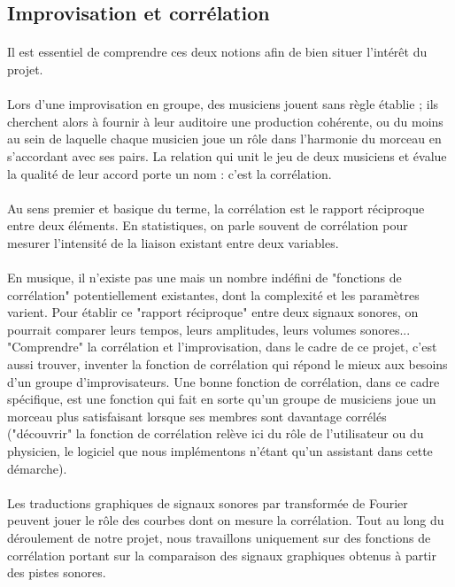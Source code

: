 \subsection{Improvisation et corrélation}
\paragraph{}

Il est essentiel de comprendre ces deux notions afin de bien situer
l'intérêt du projet.

\paragraph{}
Lors d'une improvisation en groupe, des musiciens jouent sans règle
établie ; ils cherchent alors à fournir à leur auditoire une
production cohérente, ou du moins au sein de laquelle chaque musicien
joue un rôle dans l'harmonie du morceau en s'accordant avec ses
pairs. La relation qui unit le jeu de deux musiciens et évalue la
qualité de leur accord porte un nom : c'est la corrélation.
\paragraph{}
Au sens premier et basique du terme, la corrélation est le rapport
réciproque entre deux éléments. En statistiques, on parle souvent de
corrélation pour mesurer l'intensité de la liaison existant entre deux
variables.
\paragraph{}
En musique, il n'existe pas une mais un nombre indéfini de "fonctions
de corrélation" potentiellement existantes, dont la complexité et les
paramètres varient. Pour établir ce "rapport réciproque" entre deux
signaux sonores, on pourrait comparer leurs tempos, leurs amplitudes,
leurs volumes sonores... "Comprendre" la corrélation et
l'improvisation, dans le cadre de ce projet, c'est aussi trouver,
inventer la fonction de corrélation qui répond le mieux aux besoins
d'un groupe d'improvisateurs. Une bonne fonction de corrélation, dans
ce cadre spécifique, est une fonction qui fait en sorte qu'un groupe
de musiciens joue un morceau plus satisfaisant lorsque ses membres
sont davantage corrélés ("découvrir" la fonction de corrélation relève
ici du rôle de l'utilisateur ou du physicien, le logiciel que nous
implémentons n'étant qu'un assistant dans cette démarche).
\paragraph{}
Les traductions graphiques de signaux sonores par transformée de
Fourier peuvent jouer le rôle des courbes dont on mesure la
corrélation. Tout au long du déroulement de notre projet, nous
travaillons uniquement sur des fonctions de corrélation portant sur la
comparaison des signaux graphiques obtenus à partir des pistes
sonores.

